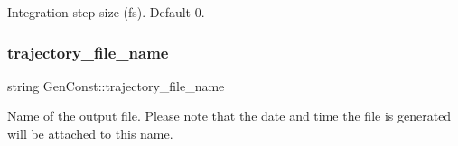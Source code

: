 Integration step size (fs). Default 0. \mbox{\label{namespaceGenConst_aadb6de9465987552f3367a893c9f0817}} 
\subsubsection{\texorpdfstring{trajectory\_file\_name}{trajectory\_file\_name}}
{\footnotesize\ttfamily string Gen\+Const\+::trajectory\+\_\+file\+\_\+name}

Name of the output file. Please note that the date and time the file is generated will be attached to this name. 